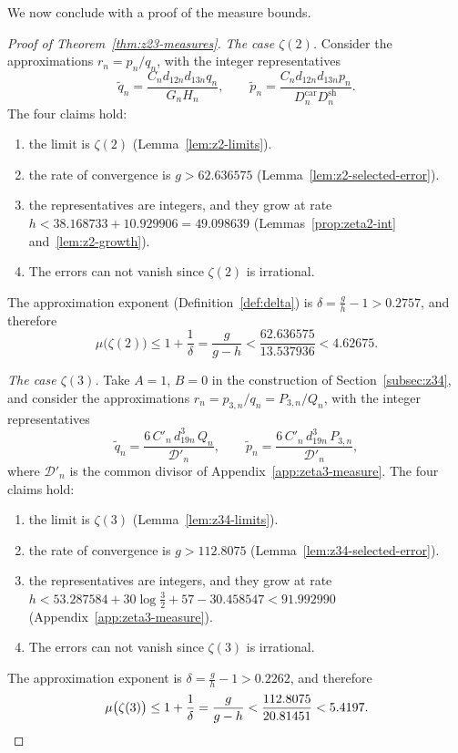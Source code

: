 \documentclass[oneside,english,11pt]{amsart}
\begin{document}
We now conclude with a proof of the measure bounds.
\begin{proof}[Proof of Theorem~\ref{thm:z23-measures}]
\emph{The case $\zeta(2)$.} Consider the approximations $r_n=p_n/q_n$,
with the integer representatives
\[
  \widetilde q_n=\frac{C_nd_{12n}d_{13n}q_n}{G_nH_n},\qquad
  \widetilde p_n=\frac{C_nd_{12n}d_{13n}p_n}{D^{\mathrm{car}}_nD^{\mathrm{sh}}_n}.
\]
The four claims hold:
\begin{enumerate}
\item the limit is $\zeta(2)$ (Lemma~\ref{lem:z2-limits}).
\item the rate of convergence is $g>62.636575$
  (Lemma~\ref{lem:z2-selected-error}).
\item the representatives are integers, and they grow at rate
  $h<38.168733+10.929906=49.098639$
  (Lemmas~\ref{prop:zeta2-int} and~\ref{lem:z2-growth}).
\item The errors can not vanish since $\zeta(2)$ is irrational.
\end{enumerate}
The approximation exponent (Definition~\ref{def:delta}) is
$\delta=\frac gh-1>0.2757$, and therefore
\[
  \mu\bigl(\zeta(2)\bigr)\le1+\frac1\delta=\frac{g}{g-h}
  <\frac{62.636575}{13.537936}<4.62675 .
\]

\emph{The case $\zeta(3)$.} Take $A=1$, $B=0$ in the construction of
Section~\ref{subsec:z34}, and consider the approximations
$r_n=p_{3,n}/q_n=P_{3,n}/Q_n$, with the integer representatives
\[
  \widetilde q_n=\frac{6\,C'_n\,d_{19n}^3\,Q_n}{\mathcal D'_n},\qquad
  \widetilde p_n=\frac{6\,C'_n\,d_{19n}^3\,P_{3,n}}{\mathcal D'_n},
\]
where $\mathcal D'_n$ is the common divisor of
Appendix~\ref{app:zeta3-measure}. The four claims hold:
\begin{enumerate}
\item the limit is $\zeta(3)$ (Lemma~\ref{lem:z34-limits}).
\item the rate of convergence is $g>112.8075$
  (Lemma~\ref{lem:z34-selected-error}).
\item the representatives are integers, and they grow at rate
  $h<53.287584+30\log\frac32+57-30.458547<91.992990$
  (Appendix~\ref{app:zeta3-measure}).
\item The errors can not vanish since $\zeta(3)$ is irrational.
\end{enumerate}
The approximation exponent is $\delta=\frac gh-1>0.2262$, and therefore
\[
  \mu\bigl(\zeta(3)\bigr)\le1+\frac1\delta=\frac{g}{g-h}
  <\frac{112.8075}{20.81451}<5.4197 .
\qedhere
\]
\end{proof}
\end{document}
